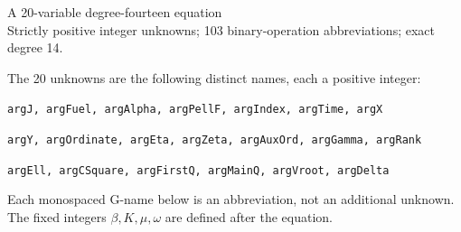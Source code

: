 \documentclass[10pt]{article}
\begin{document}
\begin{center}{\Large A 20-variable degree-fourteen equation}\\
Strictly positive integer unknowns; 103 binary-operation abbreviations; exact degree 14.
\end{center}
The 20 unknowns are the following distinct names, each a positive integer:
\par\small
\noindent\texttt{argJ, argFuel, argAlpha, argPellF, argIndex, argTime, argX}\par
\noindent\texttt{argY, argOrdinate, argEta, argZeta, argAuxOrd, argGamma, argRank}\par
\noindent\texttt{argEll, argCSquare, argFirstQ, argMainQ, argVroot, argDelta}\par
\normalsize
Each monospaced G-name below is an abbreviation, not an additional unknown.
The fixed integers $\beta,K,\mu,\omega$ are defined after the equation.
\end{document}
